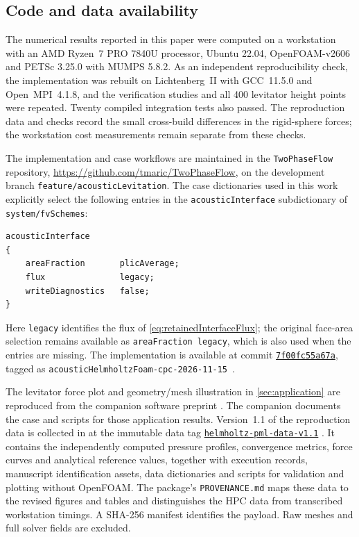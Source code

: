 \documentclass[final,12pt,nopreprintline,longtitle]{elsarticle}
\begin{document}
\begin{samepage}
\section*{Code and data availability}

The numerical results reported in this paper were computed on a workstation
with an AMD Ryzen~7 PRO 7840U processor, Ubuntu 22.04, OpenFOAM-v2606
and PETSc 3.25.0 with MUMPS 5.8.2.  As an independent reproducibility
check, the implementation was rebuilt on Lichtenberg~II with GCC~11.5.0
and Open~MPI~4.1.8, and the verification studies and all 400 levitator
height points were repeated.  Twenty compiled integration tests also passed.
The reproduction data and checks record the small cross-build differences
in the rigid-sphere forces; the workstation cost measurements remain
separate from these checks.

The implementation and case workflows are maintained in the
\texttt{TwoPhaseFlow} repository,
\url{https://github.com/tmaric/TwoPhaseFlow}, on the development branch
\texttt{feature/acousticLevitation}.  The case dictionaries used in this work
explicitly select the following entries in the
\texttt{acousticInterface} subdictionary of \texttt{system/fvSchemes}:
\begin{verbatim}
acousticInterface
{
    areaFraction       plicAverage;
    flux               legacy;
    writeDiagnostics   false;
}
\end{verbatim}
\end{samepage}
Here \texttt{legacy} identifies the flux of \cref{eq:retainedInterfaceFlux};
the original face-area selection remains available as
\texttt{areaFraction legacy}, which is also used when the entries are
missing.  The implementation is available at commit
\href{https://github.com/tmaric/TwoPhaseFlow/tree/7f00fc55a67aefbcfa88bdb46a4fc378bac0db0c}{\texttt{7f00fc55a67a}}, tagged as
\texttt{acousticHelmholtzFoam-cpc-2026-11-15}~\cite{XuLiuMaric2026AcousticSoftware}.

The levitator force plot and geometry/mesh illustration in
\cref{sec:application} are reproduced from the companion software preprint
\cite{Xu2026AcousticHelmholtzFoam}.  The companion documents the case and scripts for those
application results.  Version~1.1 of the reproduction data is collected in
 at the immutable data tag
\href{https://github.com/tmaric/TwoPhaseFlow/tree/helmholtz-pml-data-v1.1/data/publications/helmholtz-pml-v1.1}{\texttt{helmholtz-pml-data-v1.1}}
\cite{XuMaric2026HelmholtzPMLData}.  It contains the independently computed
pressure profiles, convergence metrics, force curves and analytical reference
values, together with execution records, manuscript identification assets,
data dictionaries and scripts for validation and plotting without OpenFOAM.
The package's \texttt{PROVENANCE.md} maps these data to the revised figures
and tables and distinguishes the HPC data from transcribed workstation
timings.  A SHA-256 manifest identifies the payload.  Raw meshes and full
solver fields are excluded.
\end{document}
